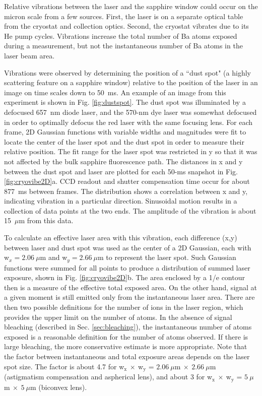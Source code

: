 Relative vibrations between the laser and the sapphire window could occur on the micron scale from a few sources.  First, the laser is on a separate optical table from the cryostat and collection optics.  Second, the cryostat vibrates due to its He pump cycles.  Vibrations increase the total number of Ba atoms exposed during a measurement, but not the instantaneous number of Ba atoms in the laser beam area.

Vibrations were observed by determining the position of a ``dust spot" (a highly scattering feature on a sapphire window) relative to the position of the laser in an image on time scales down to 50~ms.  An example of an image from this experiment is shown in Fig. \ref{fig:dustspot}.  The dust spot was illuminated by a defocused 657~nm diode laser, and the 570-nm dye laser was somewhat defocused in order to optimally defocus the red laser with the same focusing lens. For each frame, 2D Gaussian functions with variable widths and magnitudes were fit to locate the center of the laser spot and the dust spot in order to measure their relative position.  The fit range for the laser spot was restricted in y so that it was not affected by the bulk sapphire fluorescence path.  The distances in x and y between the dust spot and laser are plotted for each 50-ms snapshot in Fig. \ref{fig:cryovibe2D}a.  CCD readout and shutter compensation time occur for about 877~ms between frames.  The distribution shows a correlation between x and y, indicating vibration in a particular direction.  Sinusoidal motion results in a collection of data points at the two ends.  The amplitude of the vibration is about 15~$\mu$m from this data.

To calculate an effective laser area with this vibration, each difference (x,y) between laser and dust spot was used as the center of a 2D Gaussian, each with w$_{x} = 2.06~\mu$m and w$_{y} = 2.66~\mu$m to represent the laser spot.  Such Gaussian functions were summed for all points to produce a distribution of summed laser exposure, shown in Fig. \ref{fig:cryovibe2D}b.  The area enclosed by a 1/e contour then is a measure of the effective total exposed area.  On the other hand, signal at a given moment is still emitted only from the instantaneous laser area.  There are then two possible definitions for the number of ions in the laser region, which provides the upper limit on the number of atoms.  In the absence of signal bleaching (described in Sec. \ref{sec:bleaching}), the instantaneous number of atoms exposed is a reasonable definition for the number of atoms observed.  If there is large bleaching, the more conservative estimate is more appropriate.  Note that the factor between instantaneous and total exposure areas depends on the laser spot size.  The factor is about 4.7 for w$_{\text{x}}~\times~$w$_{\text{y}}$ = $2.06~\mu$m$~\times~2.66~\mu$m (astigmatism compensation and aspherical lens), and about 3 for w$_{\text{x}}~\times~$w$_{\text{y}}$ = $5~\mu$m$~\times~5~\mu$m (biconvex lens).

